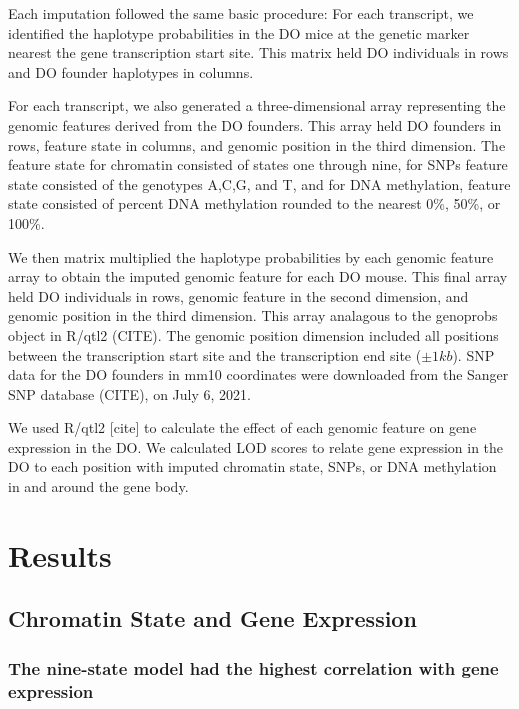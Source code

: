 \documentclass[10pt,letterpaper]{article}
\begin{document}
Each imputation followed the same basic procedure: For each transcript,
we identified the haplotype probabilities in the DO mice at the genetic
marker nearest the gene transcription start site. This matrix held DO
individuals in rows and DO founder haplotypes in columns.

For each transcript, we also generated a three-dimensional array
representing the genomic features derived from the DO founders. This
array held DO founders in rows, feature state in columns, and genomic
position in the third dimension. The feature state for chromatin
consisted of states one through nine, for SNPs feature state consisted
of the genotypes A,C,G, and T, and for DNA methylation, feature state
consisted of percent DNA methylation rounded to the nearest 0\%, 50\%,
or 100\%.

We then matrix multiplied the haplotype probabilities by each genomic
feature array to obtain the imputed genomic feature for each DO mouse.
This final array held DO individuals in rows, genomic feature in the
second dimension, and genomic position in the third dimension. This
array analagous to the genoprobs object in R/qtl2 (CITE). The genomic
position dimension included all positions between the transcription
start site and the transcription end site (\(\pm 1kb\)). SNP data for
the DO founders in mm10 coordinates were downloaded from the Sanger SNP
database (CITE), on July 6, 2021.

We used R/qtl2 {[}cite{]} to calculate the effect of each genomic
feature on gene expression in the DO. We calculated LOD scores to relate
gene expression in the DO to each position with imputed chromatin state,
SNPs, or DNA methylation in and around the gene body.

\hypertarget{results}{%
\section{Results}\label{results}}

\hypertarget{chromatin-state-and-gene-expression}{%
\subsection{Chromatin State and Gene
Expression}\label{chromatin-state-and-gene-expression}}

\hypertarget{the-nine-state-model-had-the-highest-correlation-with-gene-expression}{%
\subsubsection{The nine-state model had the highest correlation with
gene
expression}\label{the-nine-state-model-had-the-highest-correlation-with-gene-expression}}
\end{document}
